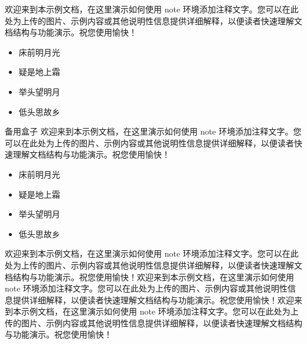 \documentclass{article}
\begin{document}
 \fontsize{22}{31}\selectfont
\newpage


\begin{note}
    欢迎来到本示例文档，在这里演示如何使用 note 环境添加注释文字。您可以在此处为上传的图片、示例内容或其他说明性信息提供详细解释，以便读者快速理解文档结构与功能演示。祝您使用愉快！
    \begin{itemize}
        \item 床前明月光
        \item 疑是地上霜
        \item 举头望明月
        \item 低头思故乡
    \end{itemize}
\end{note}


\begin{boxa}{备用盒子}
    欢迎来到本示例文档，在这里演示如何使用 note 环境添加注释文字。您可以在此处为上传的图片、示例内容或其他说明性信息提供详细解释，以便读者快速理解文档结构与功能演示。祝您使用愉快！
    \begin{itemize}
        \item 床前明月光
        \item 疑是地上霜
        \item 举头望明月
        \item 低头思故乡
    \end{itemize}
    欢迎来到本示例文档，在这里演示如何使用 note 环境添加注释文字。您可以在此处为上传的图片、示例内容或其他说明性信息提供详细解释，以便读者快速理解文档结构与功能演示。祝您使用愉快！欢迎来到本示例文档，在这里演示如何使用 note 环境添加注释文字。您可以在此处为上传的图片、示例内容或其他说明性信息提供详细解释，以便读者快速理解文档结构与功能演示。祝您使用愉快！欢迎来到本示例文档，在这里演示如何使用 note 环境添加注释文字。您可以在此处为上传的图片、示例内容或其他说明性信息提供详细解释，以便读者快速理解文档结构与功能演示。祝您使用愉快！
\end{boxa}
\end{document}
